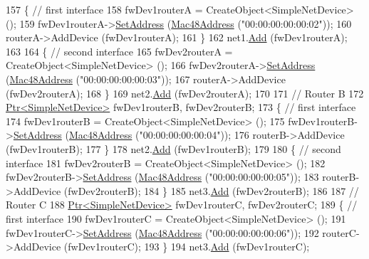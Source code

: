 \begin{DoxyCode}
157   \{ \textcolor{comment}{// first interface}
158     fwDev1routerA = CreateObject<SimpleNetDevice> ();
159     fwDev1routerA->\hyperlink{classns3_1_1SimpleNetDevice_a968ef3e7318bac29d5f1d7d977029af4}{SetAddress} (\hyperlink{classns3_1_1Mac48Address}{Mac48Address} (\textcolor{stringliteral}{"00:00:00:00:00:02"}));
160     routerA->AddDevice (fwDev1routerA);
161   \}
162   net1.\hyperlink{classns3_1_1NetDeviceContainer_a7ca8bc1d7ec00fd4fcc63869987fbda5}{Add} (fwDev1routerA);
163 
164   \{ \textcolor{comment}{// second interface}
165     fwDev2routerA = CreateObject<SimpleNetDevice> ();
166     fwDev2routerA->\hyperlink{classns3_1_1SimpleNetDevice_a968ef3e7318bac29d5f1d7d977029af4}{SetAddress} (\hyperlink{classns3_1_1Mac48Address}{Mac48Address} (\textcolor{stringliteral}{"00:00:00:00:00:03"}));
167     routerA->AddDevice (fwDev2routerA);
168   \}
169   net2.\hyperlink{classns3_1_1NetDeviceContainer_a7ca8bc1d7ec00fd4fcc63869987fbda5}{Add} (fwDev2routerA);
170 
171   \textcolor{comment}{// Router B}
172   \hyperlink{classns3_1_1Ptr}{Ptr<SimpleNetDevice>} fwDev1routerB, fwDev2routerB;
173   \{ \textcolor{comment}{// first interface}
174     fwDev1routerB = CreateObject<SimpleNetDevice> ();
175     fwDev1routerB->\hyperlink{classns3_1_1SimpleNetDevice_a968ef3e7318bac29d5f1d7d977029af4}{SetAddress} (\hyperlink{classns3_1_1Mac48Address}{Mac48Address} (\textcolor{stringliteral}{"00:00:00:00:00:04"}));
176     routerB->AddDevice (fwDev1routerB);
177   \}
178   net2.\hyperlink{classns3_1_1NetDeviceContainer_a7ca8bc1d7ec00fd4fcc63869987fbda5}{Add} (fwDev1routerB);
179 
180   \{ \textcolor{comment}{// second interface}
181     fwDev2routerB = CreateObject<SimpleNetDevice> ();
182     fwDev2routerB->\hyperlink{classns3_1_1SimpleNetDevice_a968ef3e7318bac29d5f1d7d977029af4}{SetAddress} (\hyperlink{classns3_1_1Mac48Address}{Mac48Address} (\textcolor{stringliteral}{"00:00:00:00:00:05"}));
183     routerB->AddDevice (fwDev2routerB);
184   \}
185   net3.\hyperlink{classns3_1_1NetDeviceContainer_a7ca8bc1d7ec00fd4fcc63869987fbda5}{Add} (fwDev2routerB);
186 
187   \textcolor{comment}{// Router C}
188   \hyperlink{classns3_1_1Ptr}{Ptr<SimpleNetDevice>} fwDev1routerC, fwDev2routerC;
189   \{ \textcolor{comment}{// first interface}
190     fwDev1routerC = CreateObject<SimpleNetDevice> ();
191     fwDev1routerC->\hyperlink{classns3_1_1SimpleNetDevice_a968ef3e7318bac29d5f1d7d977029af4}{SetAddress} (\hyperlink{classns3_1_1Mac48Address}{Mac48Address} (\textcolor{stringliteral}{"00:00:00:00:00:06"}));
192     routerC->AddDevice (fwDev1routerC);
193   \}
194   net3.\hyperlink{classns3_1_1NetDeviceContainer_a7ca8bc1d7ec00fd4fcc63869987fbda5}{Add} (fwDev1routerC);

\end{DoxyCode}
